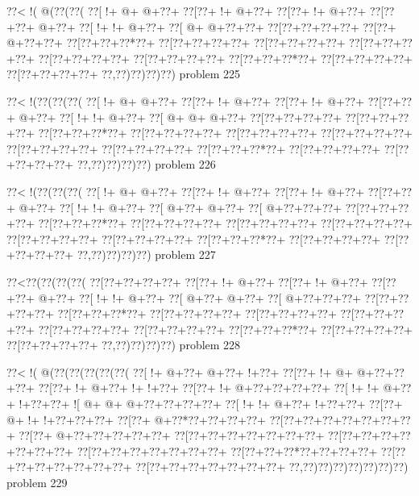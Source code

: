 \vbox{\vbox{\goo
\0??<\- !(\- @(\0??(\0??(
\0??[\- !+\- @+\- @+\0??+
\0??[\0??+\- !+\- @+\0??+
\0??[\0??+\- !+\- @+\0??+
\0??[\0??+\0??+\- @+\0??+
\0??[\- !+\- !+\- @+\0??+
\0??[\- @+\- @+\0??+\0??+
\0??[\0??+\0??+\0??+\0??+
\0??[\0??+\- @+\0??+\0??+
\0??[\0??+\0??+\0??*\0??+
\0??[\0??+\0??+\0??+\0??+
\0??[\0??+\0??+\0??+\0??+
\0??[\0??+\0??+\0??+\0??+
\0??[\0??+\0??+\0??+\0??+
\0??[\0??+\0??+\0??+\0??+
\0??[\0??+\0??+\0??*\0??+
\0??[\0??+\0??+\0??+\0??+
\0??[\0??+\0??+\0??+\0??+
\0??,\0??)\0??)\0??)\0??)
}
\hfil problem 225\hfil\break
}

\vbox{\vbox{\goo
\0??<\- !(\0??(\0??(\0??(
\0??[\- !+\- @+\- @+\0??+
\0??[\0??+\- !+\- @+\0??+
\0??[\0??+\- !+\- @+\0??+
\0??[\0??+\0??+\- @+\0??+
\0??[\- !+\- !+\- @+\0??+
\0??[\- @+\- @+\- @+\0??+
\0??[\0??+\0??+\0??+\0??+
\0??[\0??+\0??+\0??+\0??+
\0??[\0??+\0??+\0??*\0??+
\0??[\0??+\0??+\0??+\0??+
\0??[\0??+\0??+\0??+\0??+
\0??[\0??+\0??+\0??+\0??+
\0??[\0??+\0??+\0??+\0??+
\0??[\0??+\0??+\0??+\0??+
\0??[\0??+\0??+\0??*\0??+
\0??[\0??+\0??+\0??+\0??+
\0??[\0??+\0??+\0??+\0??+
\0??,\0??)\0??)\0??)\0??)
}
\hfil problem 226\hfil\break
}

\vbox{\vbox{\goo
\0??<\- !(\0??(\0??(\0??(
\0??[\- !+\- @+\- @+\0??+
\0??[\0??+\- !+\- @+\0??+
\0??[\0??+\- !+\- @+\0??+
\0??[\0??+\0??+\- @+\0??+
\0??[\- !+\- !+\- @+\0??+
\0??[\- @+\0??+\- @+\0??+
\0??[\- @+\0??+\0??+\0??+
\0??[\0??+\0??+\0??+\0??+
\0??[\0??+\0??+\0??*\0??+
\0??[\0??+\0??+\0??+\0??+
\0??[\0??+\0??+\0??+\0??+
\0??[\0??+\0??+\0??+\0??+
\0??[\0??+\0??+\0??+\0??+
\0??[\0??+\0??+\0??+\0??+
\0??[\0??+\0??+\0??*\0??+
\0??[\0??+\0??+\0??+\0??+
\0??[\0??+\0??+\0??+\0??+
\0??,\0??)\0??)\0??)\0??)
}
\hfil problem 227\hfil\break
}

\vbox{\vbox{\goo
\0??<\0??(\0??(\0??(\0??(
\0??[\0??+\0??+\0??+\0??+
\0??[\0??+\- !+\- @+\0??+
\0??[\0??+\- !+\- @+\0??+
\0??[\0??+\0??+\- @+\0??+
\0??[\- !+\- !+\- @+\0??+
\0??[\- @+\0??+\- @+\0??+
\0??[\- @+\0??+\0??+\0??+
\0??[\0??+\0??+\0??+\0??+
\0??[\0??+\0??+\0??*\0??+
\0??[\0??+\0??+\0??+\0??+
\0??[\0??+\0??+\0??+\0??+
\0??[\0??+\0??+\0??+\0??+
\0??[\0??+\0??+\0??+\0??+
\0??[\0??+\0??+\0??+\0??+
\0??[\0??+\0??+\0??*\0??+
\0??[\0??+\0??+\0??+\0??+
\0??[\0??+\0??+\0??+\0??+
\0??,\0??)\0??)\0??)\0??)
}
\hfil problem 228\hfil\break
}

\vbox{\vbox{\goo
\0??<\- !(\- @(\0??(\0??(\0??(\0??(\0??(
\0??[\- !+\- @+\0??+\- @+\0??+\- !+\0??+
\0??[\0??+\- !+\- @+\- @+\0??+\0??+\0??+
\0??[\0??+\- !+\- @+\0??+\- !+\- !+\0??+
\0??[\0??+\- !+\- @+\0??+\0??+\0??+\0??+
\0??[\- !+\- !+\- @+\0??+\- !+\0??+\0??+
\- ![\- @+\- @+\- @+\0??+\0??+\0??+\0??+
\0??[\- !+\- !+\- @+\0??+\- !+\0??+\0??+
\0??[\0??+\- @+\- !+\- !+\0??+\0??+\0??+
\0??[\0??+\- @+\0??*\0??+\0??+\0??+\0??+
\0??[\0??+\0??+\0??+\0??+\0??+\0??+\0??+
\0??[\0??+\- @+\0??+\0??+\0??+\0??+\0??+
\0??[\0??+\0??+\0??+\0??+\0??+\0??+\0??+
\0??[\0??+\0??+\0??+\0??+\0??+\0??+\0??+
\0??[\0??+\0??+\0??+\0??+\0??+\0??+\0??+
\0??[\0??+\0??+\0??*\0??+\0??+\0??+\0??+
\0??[\0??+\0??+\0??+\0??+\0??+\0??+\0??+
\0??[\0??+\0??+\0??+\0??+\0??+\0??+\0??+
\0??,\0??)\0??)\0??)\0??)\0??)\0??)\0??)
}
\hfil problem 229\hfil\break
}

